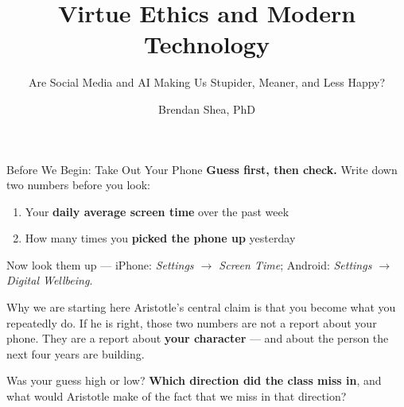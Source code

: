﻿\documentclass[aspectratio=169,11pt]{beamer}
\title[Virtue Ethics \& Technology]{Virtue Ethics and Modern Technology}
\subtitle{Are Social Media and AI Making Us Stupider, Meaner, and Less Happy?}
\author{Brendan Shea, PhD}
\institute{Rochester Community and Technical College\\PHIL 1150: Computing and AI Ethics}
\date{}
\begin{document}




\begin{frame}{Before We Begin: Take Out Your Phone}
\textbf{Guess first, then check.} Write down two numbers before you look:
\begin{enumerate}
    \item Your \textbf{daily average screen time} over the past week
    \item How many times you \textbf{picked the phone up} yesterday
\end{enumerate}

Now look them up --- iPhone: \emph{Settings $\rightarrow$ Screen Time}; Android: \emph{Settings $\rightarrow$ Digital Wellbeing}.

\begin{alertblock}{Why we are starting here}
Aristotle's central claim is that you become what you repeatedly do. If he is right, those two numbers are not a report about your phone. They are a report about \textbf{your character} --- and about the person the next four years are building.
\end{alertblock}

\begin{discussionbox}
Was your guess high or low? \textbf{Which direction did the class miss in}, and what would Aristotle make of the fact that we miss in that direction?
\end{discussionbox}
\end{frame}
\end{document}
